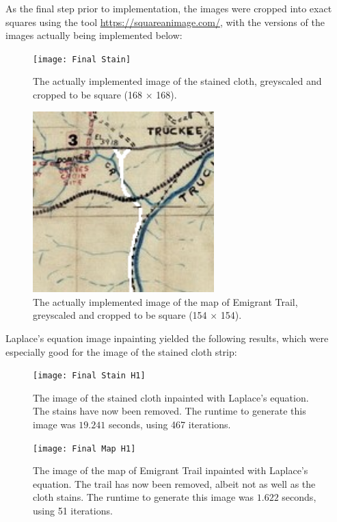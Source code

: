 \documentclass[11pt,reqno,twoside]{amsart}
\theoremstyle{plain}
\theoremstyle{definition}
\numberwithin{figure}{section}
\numberwithin{equation}{section}
\begin{document}
\newpage

As the final step prior to implementation, the images were cropped into exact squares using the tool \url{https://squareanimage.com/}, with the versions of the images actually being implemented below:

\begin{center}
\begin{figure}[h]
\caption{The actually implemented image of the stained cloth, greyscaled and cropped to be square (168 $\times$ 168).}
\vskip 1mm
\texttt{[image: Final Stain]}
\end{figure}
\end{center}
\begin{center}
\begin{figure}[h]
\caption{The actually implemented image of the map of Emigrant Trail, greyscaled and cropped to be square (154 $\times$ 154).}
\vskip 1mm
\includegraphics[width = 7cm]{Final Map}
\end{figure}
\end{center}

\newpage

Laplace's equation image inpainting yielded the following results, which were especially good for the image of the stained cloth strip:

\begin{center}
\begin{figure}[h]
\caption{The image of the stained cloth inpainted with Laplace's equation.  The stains have now been removed.  The runtime to generate this image was $19.241$ seconds, using 467 iterations.}
\vskip 1mm
\texttt{[image: Final Stain H1]}
\end{figure}
\end{center}
\begin{center}
\begin{figure}[h]
\caption{The image of the map of Emigrant Trail inpainted with Laplace's equation.  The trail has now been removed, albeit not as well as the cloth stains.  The runtime to generate this image was $1.622$ seconds, using 51 iterations.}
\vskip 1mm
\texttt{[image: Final Map H1]}
\end{figure}
\end{center}
\end{document}
